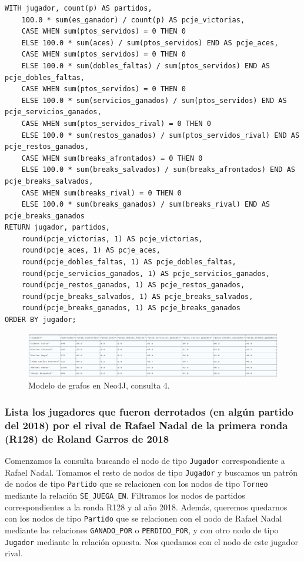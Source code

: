 \begin{verbatim}
WITH jugador, count(p) AS partidos,
    100.0 * sum(es_ganador) / count(p) AS pcje_victorias,
    CASE WHEN sum(ptos_servidos) = 0 THEN 0
    ELSE 100.0 * sum(aces) / sum(ptos_servidos) END AS pcje_aces,
    CASE WHEN sum(ptos_servidos) = 0 THEN 0
    ELSE 100.0 * sum(dobles_faltas) / sum(ptos_servidos) END AS pcje_dobles_faltas,
    CASE WHEN sum(ptos_servidos) = 0 THEN 0
    ELSE 100.0 * sum(servicios_ganados) / sum(ptos_servidos) END AS pcje_servicios_ganados,
    CASE WHEN sum(ptos_servidos_rival) = 0 THEN 0
    ELSE 100.0 * sum(restos_ganados) / sum(ptos_servidos_rival) END AS pcje_restos_ganados,
    CASE WHEN sum(breaks_afrontados) = 0 THEN 0
    ELSE 100.0 * sum(breaks_salvados) / sum(breaks_afrontados) END AS pcje_breaks_salvados,
    CASE WHEN sum(breaks_rival) = 0 THEN 0
    ELSE 100.0 * sum(breaks_ganados) / sum(breaks_rival) END AS pcje_breaks_ganados
RETURN jugador, partidos,
    round(pcje_victorias, 1) AS pcje_victorias,
    round(pcje_aces, 1) AS pcje_aces,
    round(pcje_dobles_faltas, 1) AS pcje_dobles_faltas,
    round(pcje_servicios_ganados, 1) AS pcje_servicios_ganados,
    round(pcje_restos_ganados, 1) AS pcje_restos_ganados,
    round(pcje_breaks_salvados, 1) AS pcje_breaks_salvados,
    round(pcje_breaks_ganados, 1) AS pcje_breaks_ganados
ORDER BY jugador;
\end{verbatim}

\begin{figure}[H]
\centering
\includegraphics[width=\textwidth]{fotos/q4_neo.png}
\caption{Modelo de grafos en Neo4J, consulta 4.}
\label{fig:q4_neo}
\end{figure}





\subsubsection{Lista los jugadores que fueron derrotados (en algún partido del 2018) por el rival de Rafael Nadal de la primera ronda (R128) de Roland Garros de 2018}

Comenzamos la consulta buscando el nodo de tipo \texttt{Jugador} correspondiente a Rafael Nadal. Tomamos el resto de nodos de tipo \texttt{Jugador} y buscamos un patrón de nodos de tipo \texttt{Partido} que se relacionen con los nodos de tipo \texttt{Torneo} mediante la relación \texttt{SE\_JUEGA\_EN}. Filtramos los nodos de partidos correspondientes a la ronda R128 y al año 2018. Además, queremos quedarnos con los nodos de tipo \texttt{Partido} que se relacionen con el nodo de Rafael Nadal mediante las relaciones \texttt{GANADO\_POR} o \texttt{PERDIDO\_POR}, y con otro nodo de tipo \texttt{Jugador} mediante la relación opuesta. Nos quedamos con el nodo de este jugador rival. \\

